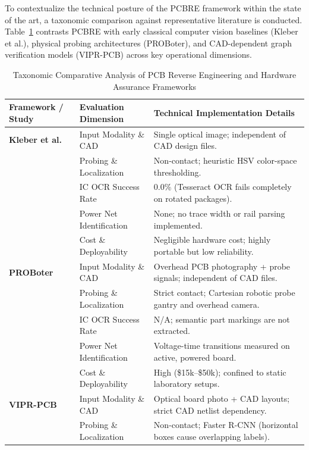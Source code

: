 \documentclass[12pt,a4paper]{report}
\begin{document}
To contextualize the technical posture of the PCBRE framework within the state of the art, a taxonomic comparison against representative literature is conducted. Table~\ref{tab:literature_comparison} contrasts PCBRE with early classical computer vision baselines (Kleber et al.), physical probing architectures (PROBoter), and CAD-dependent graph verification models (VIPR-PCB) across key operational dimensions.

\begin{table}[H]
  \footnotesize
  \centering
  \caption{Taxonomic Comparative Analysis of PCB Reverse Engineering and Hardware Assurance Frameworks}
  \label{tab:literature_comparison}
  \renewcommand{\arraystretch}{0.9}
  \begin{tabular}{@{}llp{8.5cm}@{}}
    \toprule
    \textbf{Framework / Study} & \textbf{Evaluation Dimension} & \textbf{Technical Implementation Details} \\
    \midrule
    \textbf{Kleber et al.}~\cite{kleber2017woot} & Input Modality \& CAD & Single optical image; independent of CAD design files. \\
    & Probing \& Localization & Non-contact; heuristic HSV color-space thresholding. \\
    & IC OCR Success Rate & 0.0\% (Tesseract OCR fails completely on rotated packages). \\
    & Power Net Identification & None; no trace width or rail parsing implemented. \\
    & Cost \& Deployability & Negligible hardware cost; highly portable but low reliability. \\
    \midrule
    \textbf{PROBoter}~\cite{weber2021proboter} & Input Modality \& CAD & Overhead PCB photography + probe signals; independent of CAD files. \\
    & Probing \& Localization & Strict contact; Cartesian robotic probe gantry and overhead camera. \\
    & IC OCR Success Rate & N/A; semantic part markings are not extracted. \\
    & Power Net Identification & Voltage-time transitions measured on active, powered board. \\
    & Cost \& Deployability & High (\$15k--\$50k); confined to static laboratory setups. \\
    \midrule
    \textbf{VIPR-PCB}~\cite{bhattacharyay2022vipr} & Input Modality \& CAD & Optical board photo + CAD layouts; strict CAD netlist dependency. \\
    & Probing \& Localization & Non-contact; Faster R-CNN (horizontal boxes cause overlapping labels). \\

\end{tabular}
\end{table}
\end{document}
